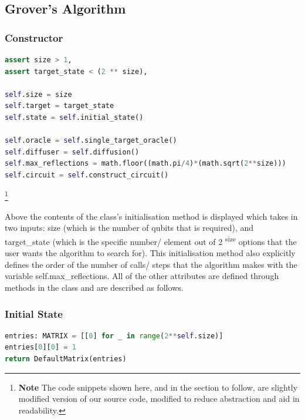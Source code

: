 \documentclass{article}
\begin{document}
\subsection{Grover's Algorithm} \label{Implement Grovers}

\subsubsection{Constructor} \label{constructor}

\begin{file}

\begin{lstlisting}[linewidth=15cm,language=Python]
assert size > 1, 
assert target_state < (2 ** size),

self.size = size
self.target = target_state
self.state = self.initial_state()

self.oracle = self.single_target_oracle()
self.diffuser = self.diffusion()
self.max_reflections = math.floor((math.pi/4)*(math.sqrt(2**size)))
self.circuit = self.construct_circuit()
\end{lstlisting}
\end{file}\footnote{\textbf{Note} The code snippets shown here, and in the section to follow, are slightly modified version of our source code, modified to reduce abstraction and aid in readability.}

Above the contents of the class's initialisation method is displayed which takes in two inputs: size (which is the number of qubits that is required), and target\_state (which is the specific number/ element out of 2 \textsuperscript{size} options that the user wants the algorithm to search for). This initialisation method also explicitly defines the order of the number of calls/ steps that the algorithm makes with the variable self.max\_reflections. All of the other attributes are defined through methods in the class and are described as follows.

\subsubsection{Initial State} \label{Initial State}

\begin{file}
\begin{lstlisting}[language=Python]
entries: MATRIX = [[0] for _ in range(2**self.size)]
entries[0][0] = 1
return DefaultMatrix(entries)
\end{lstlisting}
\end{file}
\end{document}
